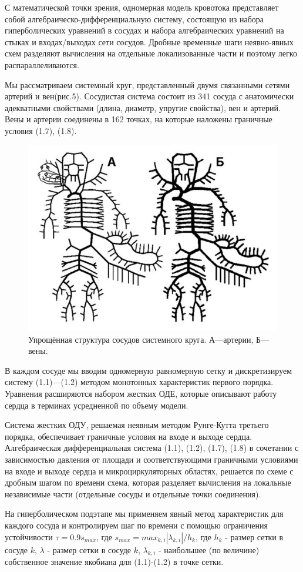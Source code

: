 С математической точки зрения, одномерная модель кровотока представляет собой алгебраическо-дифференциальную систему, состоящую из набора гиперболических уравнений в сосудах и набора алгебраических уравнений на стыках и входах/выходах сети сосудов. Дробные временные шаги неявно-явных схем разделяют вычисления на отдельные локализованные части и поэтому легко распараллеливаются.

Мы рассматриваем системный круг, представленный двумя связанными сетями артерий и вен(рис.5). Сосудистая система состоит из 341 сосуда с анатомически адекватными свойствами (длина, диаметр, упругие свойства), вен и артерий. Вены и артерии соединены в 162 точках, на которые наложены граничные условия (1.7), (1.8). 

\begin{figure}[h]
\centering
\includegraphics[width=0.5\linewidth]{krug.png}
\caption{Упрощённая структура сосудов системного круга. А—артерии, Б—вены.}
\label{fig:mpr}
\end{figure}

В каждом сосуде мы вводим одномерную равномерную сетку и дискретизируем систему (1.1)—(1.2) методом монотонных характеристик первого порядка. Уравнения расширяются набором жестких ОДЕ, которые описывают работу сердца в терминах усредненной по объему модели.

Система жестких ОДУ, решаемая неявным методом Рунге-Кутта третьего порядка, обеспечивает граничные условия на входе и выходе сердца. Алгебраическая дифференциальная система (1.1), (1.2), (1.7), (1.8) в сочетании с зависимостью давления от площади и соответствующими граничными условиями на входе и выходе сердца и микроциркуляторных областях, решается по схеме с дробным шагом по времени схема, которая разделяет вычисления на локальные независимые части (отдельные сосуды и отдельные точки соединения).

На гиперболическом подэтапе мы применяем явный метод характеристик для каждого сосуда и контролируем шаг по времени с помощью ограничения устойчивости $\tau = 0.9 s_{max}$, где $s_{max}=max_{k,i}|\lambda _{k,i}|/h_k$, где $h_k$ - размер сетки в сосуде $k$, $\lambda$ - размер сетки в сосуде $k$,  $\lambda _{k,i}$ - наибольшее (по величине) собственное значение якобиана для (1.1)-(1.2) в точке сетки.

